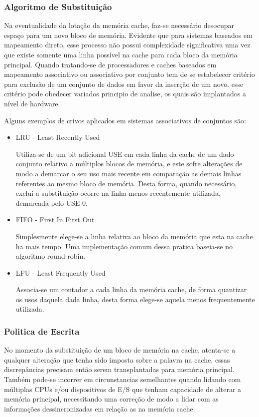 \documentclass[12pt]{article}
\begin{document}
\subsubsection*{Algoritmo de Substituição}
Na eventualidade da lotação da memória cache, faz-se necessário desocupar espaço para um novo bloco de memória. Evidente que para sistemas baseados em mapeamento direto, esse processo não possui complexidade significativa uma vez que existe somente uma linha possível na cache para cada bloco da memória principal. Quando tratando-se de processadores e caches baseados em mapeamento associativo ou associativo por conjunto tem de se estabelecer critério para exclusão de um conjunto de dados em favor da inserção de um novo. esse critério pode obedecer variados principio de analise, os quais são implantados a nível de hardware. 

Alguns exemplos de crivos aplicados em sistemas associativos de conjuntos são:
\begin{itemize}
\item LRU - Least Recently Used

Utiliza-se de um bit adicional USE em cada linha da cache de um dado conjunto relativo a múltiplos blocos de memória, e este sofre alterações de modo a demarcar o seu uso mais recente em comparação as demais linhas referentes ao mesmo bloco de memória. Desta forma, quando necessário, exclui a substituição ocorre na linha menos recentemente utilizada, demarcada pelo USE 0.

\item FIFO - First In First Out

Simplesmente elege-se a linha relativa ao bloco da memória que esta na cache ha mais tempo. Uma implementação comum dessa pratica baseia-se no algoritmo round-robin.

\item LFU - Least Frequently Used

Associa-se um contador a cada linha da memória cache, de forma quantizar os usos daquela dada linha, desta forma elege-se aquela menos frequentemente utilizada.  
\end{itemize}

\subsubsection*{Politica de Escrita}
No momento da substituição de um bloco de memória na cache, atenta-se a qualquer alteração que tenha sido imposta sobre a palavra na cache, essas discrepâncias precisam então serem transplantadas para memória principal. Também pode-se incorrer em circunstancias semelhantes quando lidando com múltiplas CPUs e/ou dispositivos de E/S que tenham capacidade de alterar a memória principal, necessitando uma correção de modo a lidar com as informações dessincronizadas em relação as na memória cache.
\end{document}
